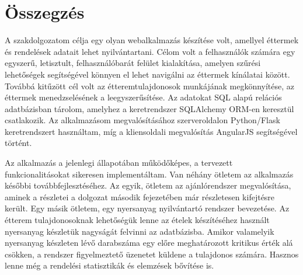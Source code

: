\chapter{Összegzés}

A szakdolgozatom célja egy olyan webalkalmazás készítése volt, amellyel éttermek és rendelések adatait lehet nyilvántartani. Célom volt a felhasználók számára egy egyszerű, letisztult, felhasználóbarát felület kialakítása, amelyen szűrési lehetőségek segítségével könnyen el lehet navigálni az éttermek kínálatai között. Továbbá kitűzött cél volt az étteremtulajdonosok munkájának megkönnyítése, az éttermek menedzselésének a leegyszerűsítése. Az adatokat SQL alapú relációs adatbázisban tárolom, amelyhez a keretrendszer SQLAlchemy ORM-en keresztül csatlakozik. Az alkalmazásom megvalósításához szerveroldalon Python/Flask keretrendszert használtam, míg a kliensoldali megvalósítás AngularJS segítségével történt.

Az alkalmazás a jelenlegi állapotában működőképes, a tervezett funkcionalitásokat sikeresen implementáltam. Van néhány ötletem az alkalmazás későbbi továbbfejlesztéséhez. Az egyik, ötletem az ajánlórendszer megvalósítása, aminek a részletei a dolgozat második fejezetében már részletesen kifejtésre került. Egy másik ötletem, egy nyersanyag nyilvántartó rendszer bevezetése. Az étterem tulajdonosoknak lehetőségük lenne az ételek készítéséhez használt nyersanyag készletük nagyságát felvinni az adatbázisba. Amikor valamelyik nyersanyag készleten lévő darabszáma egy előre meghatározott kritikus érték alá csökken, a rendszer figyelmeztető üzenetet küldene a tulajdonos számára. Hasznos lenne még a rendelési statisztikák és elemzések bővítése is.
